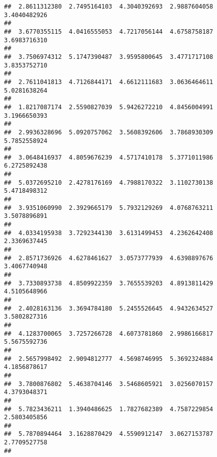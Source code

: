 \documentclass[]{article}
\begin{document}
\begin{verbatim}
##  2.8611312380  2.7495164103  4.3040392693  2.9887604058  3.4040482926 
##                                                                       
##  3.6770355115  4.0416555053  4.7217056144  4.6758758187  3.6983716310 
##                                                                       
##  3.7506974312  5.1747390487  3.9595800645  3.4771717108  3.8353752710 
##                                                                       
##  2.7611041813  4.7126844171  4.6612111683  3.0636464611  5.0281638264 
##                                                                       
##  1.8217087174  2.5590827039  5.9426272210  4.8456004991  3.1966650393 
##                                                                       
##  2.9936328696  5.0920757062  3.5608392606  3.7868930309  5.7852558924 
##                                                                       
##  3.0648416937  4.8059676239  4.5717410178  5.3771011986  6.2725892438 
##                                                                       
##  5.0372695210  2.4278176169  4.7988170322  3.1102730138  5.4718498312 
##                                                                       
##  3.9351060990  2.3929665179  5.7932129269  4.0768763211  3.5078896891 
##                                                                       
##  4.0334195938  3.7292344130  3.6131499453  4.2362642408  2.3369637445 
##                                                                       
##  2.8571736926  4.6278461627  3.0573777939  4.6398897676  3.4067740948 
##                                                                       
##  3.7330893738  4.8509922359  3.7655539203  4.8913811429  4.5105648966 
##                                                                       
##  2.4028163136  3.3694784180  5.2455526645  4.9432634527  3.5802827316 
##                                                                       
##  4.1283700065  3.7257266728  4.6073781860  2.9986166817  5.5675592736 
##                                                                       
##  2.5657998492  2.9094812777  4.5698746995  5.3692324884  4.1856878617 
##                                                                       
##  3.7800876802  5.4638704146  3.5468605921  3.0256070157  4.3793048371 
##                                                                       
##  5.7823436211  1.3940486625  1.7827682389  4.7587229854  2.5803405856 
##                                                                       
##  5.7870894464  3.1628870429  4.5590912147  3.0627153787  2.7709527758 
##                                                                       

\end{verbatim}
\end{document}
